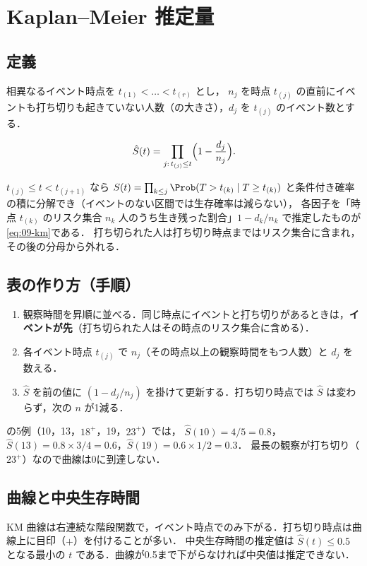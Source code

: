 \section{Kaplan--Meier 推定量}\label{sec:09-km}
\Hissu\Hinshutsu
\subsection{定義}
相異なるイベント時点を $t_{(1)}<\dots<t_{(r)}$ とし，
$n_j$ を時点 $t_{(j)}$ の直前にイベントも打ち切りも起きていない人数（の大きさ），$d_j$ を $t_{(j)}$ のイベント数とする．
\begin{teigi}\label{def:09-km}
\begin{equation}
\hat S(t)=\prod_{j:\,t_{(j)}\le t}\Bigl(1-\frac{d_j}{n_j}\Bigr).\label{eq:09-km}
\end{equation}
\end{teigi}
$t_{(j)}\le t<t_{(j+1)}$ なら $S(t)=\prod_{k\le j}\Prob(T>t_{(k)}\mid T\ge t_{(k)})$ と条件付き確率の積に分解でき（イベントのない区間では生存確率は減らない），
各因子を「時点 $t_{(k)}$ のリスク集合 $n_k$ 人のうち生き残った割合」$1-d_k/n_k$ で推定したものが\cref{eq:09-km}である．
打ち切られた人は打ち切り時点まではリスク集合に含まれ，その後の分母から外れる．

\subsection{表の作り方（手順）}
\begin{enumerate}
\item 観察時間を昇順に並べる．同じ時点にイベントと打ち切りがあるときは，\textbf{イベントが先}（打ち切られた人はその時点のリスク集合に含める）．
\item 各イベント時点 $t_{(j)}$ で $n_j$（その時点以上の観察時間をもつ人数）と $d_j$ を数える．
\item $\hat S$ を前の値に $(1-d_j/n_j)$ を掛けて更新する．打ち切り時点では $\hat S$ は変わらず，次の $n$ が1減る．
\end{enumerate}
 の5例（10，13，$18^+$，19，$23^+$）では，
$\hat S(10)=4/5=0.8$，$\hat S(13)=0.8\times3/4=0.6$，$\hat S(19)=0.6\times1/2=0.3$．
最長の観察が打ち切り（$23^+$）なので曲線は0に到達しない．

\subsection{曲線と中央生存時間}
KM 曲線は右連続な階段関数で，イベント時点でのみ下がる．打ち切り時点は曲線上に目印（$+$）を付けることが多い．
中央生存時間の推定値は $\hat S(t)\le0.5$ となる最小の $t$ である．曲線が0.5まで下がらなければ中央値は推定できない．

